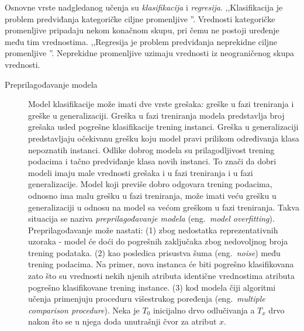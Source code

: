 \documentclass[12pt,oneside]{memoir}
\begin{document}
Osnovne vrste nadgledanog učenja su \textit{klasifikacija} i \textit{regresija}.
,,Klasifikacija je problem predviđanja kategoričke ciljne promenljive \cite{mladen}''. Vrednosti kategoričke promenljive pripadaju nekom konačnom skupu, pri čemu ne postoji uređenje među tim vrednostima. 
,,Regresija je problem predviđanja neprekidne ciljne promenljive \cite{mladen}''.  Neprekidne promenljive uzimaju vrednosti iz neograničenog skupa vrednosti.

\begin{description}
\item[Preprilagođavanje modela] Model klasifikacije može imati dve vrste grešaka: greške u fazi treniranja i greške u generalizaciji. Greška u fazi treniranja modela predstavlja broj grešaka usled pogrešne klasifikacije trening instanci. Greška u generalizaciji predstavljaju očekivanu grešku koju model pravi prilikom određivanja klasa nepoznatih instanci. Odlike dobrog modela su prilagodljivost trening podacima i tačno predviđanje klasa novih instanci. To znači da dobri modeli imaju male vrednosti grešaka i u fazi treniranja i u fazi generalizacije. Model koji previše dobro odgovara trening podacima, odnosno ima malu grešku u fazi treniranja, može imati veću grešku u generalizaciji u odnosu na model sa većom greškom u fazi treniranja. Takva situacija se naziva \textit{preprilagođavanje modela} (eng.~\textit{model overfitting}). Preprilagođavanje može nastati: (1) zbog nedostatka reprezentativnih uzoraka - model će doći do pogrešnih zaključaka zbog nedovoljnog broja trening podataka. (2) kao posledica prisustva šuma (eng.~\textit{noise}) među trening podacima. Na primer, nova instanca će biti pogrešno klasifikovana zato što su vrednosti nekih njenih atributa identične vrednostima atributa pogrešno klasifikovane trening instance.  (3) kod modela čiji algoritmi učenja primenjuju proceduru višestrukog poređenja (eng.~\textit{multiple comparison procedure}). Neka je $T_0$ inicijalno drvo odlučivanja a $T_x$ drvo nakon što se u njega doda unutrašnji čvor za atribut $x$. %

\end{description}
\end{document}
